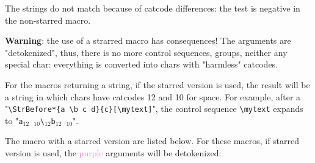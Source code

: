 \documentclass[a4paper,10pt]{article}
\newcommand\guill[1]{"#1"}
\newcommand\verbinline{\lstinline[basicstyle=\normalsize\ttfamily]}
\begin{document}
The strings do not match because of catcode differences: the test is negative in the non-starred macro.\bigskip

\textbf{Warning}: the use of a strarred macro has consequences! The arguments are \guill{detokenized}, thus, there is no more control sequences, groups, neither any special char: everything is converted into chars with "harmless" catcodes.\medskip

For the macros returning a string, if the starred version is used, the result will be a string in which chars have catcodes 12 and 10 for space. For example, after a "\verbinline|\StrBefore*{a \b c d}{c}[\mytext]|", the control sequence \verb|\mytext| expands to "\verb|a|${}_{12}$\verb*| |${}_{10}$\verb|\|${}_{12}$\verb|b|${}_{12}$\verb*| |${}_{10}$".\medskip

The macro with a starred version are listed below. For these macros, if starred version is used, the \textcolor{violet}{purple} arguments will be detokenized:\smallskip
\end{document}
